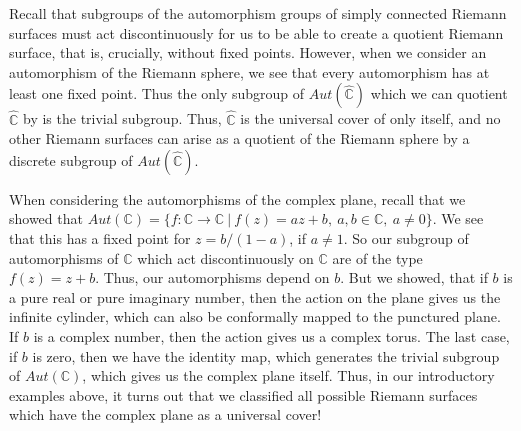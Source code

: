 \documentclass[11pt]{report}
\theoremstyle{definition}
\begin{document}
Recall that subgroups of the automorphism groups of simply connected Riemann surfaces must act discontinuously for us to be able to create a quotient Riemann surface, that is, crucially, without fixed points. However, when we consider an automorphism of the Riemann sphere, we see that every automorphism has at least one fixed point. Thus the only subgroup of $Aut(\widehat{\mathbb{C}})$ which we can quotient $\widehat{\mathbb{C}}$ by is the trivial subgroup. Thus, $\widehat{\mathbb{C}}$ is the universal cover of only itself, and no other Riemann surfaces can arise as a quotient of the Riemann sphere by a discrete subgroup of $Aut(\widehat{\mathbb{C}})$.

When considering the automorphisms of the complex plane, recall that we showed that $Aut(\mathbb{C})= \{f:\mathbb{C}\rightarrow \mathbb{C} \ \vert \ f(z) = az + b, \ a,b\in\mathbb{C}, \ a \neq 0\}$. We see that this has a fixed point for $z = b/(1-a)$, if $a \neq 1$. So our subgroup of automorphisms of $\mathbb{C}$ which act discontinuously on $\mathbb{C}$ are of the type $f(z) = z + b$. Thus, our automorphisms depend on $b$. But we showed, that if $b$ is a pure real or pure imaginary number, then the action on the plane gives us the infinite cylinder, which can also be conformally mapped to the punctured plane. If $b$ is a complex number, then the action gives us a complex torus. The last case, if $b$ is zero, then we have the identity map, which generates the trivial subgroup of $Aut(\mathbb{C})$, which gives us the complex plane itself. Thus, in our introductory examples above, it turns out that we classified all possible Riemann surfaces which have the complex plane as a universal cover!
\end{document}
